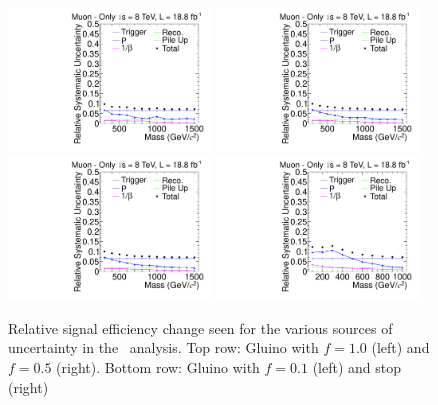 \begin{figure}[ht]
\centering
  \includegraphics[clip=false, trim=0.0cm 0cm 0.0cm 0cm, width=0.48\textwidth]{figures/muonly/MoGluino_f100Uncertainty}
  \includegraphics[clip=false, trim=0.0cm 0cm 0.0cm 0cm, width=0.48\textwidth]{figures/muonly/MoGluino_f50Uncertainty} \\
  \includegraphics[clip=false, trim=0.0cm 0cm 0.0cm 0cm, width=0.48\textwidth]{figures/muonly/MoGluino_f10Uncertainty}
  \includegraphics[clip=false, trim=0.0cm 0cm 0.0cm 0cm, width=0.48\textwidth]{figures/muonly/MoStopUncertainty}
\caption[Relative signal efficiency change seen for the various sources of uncertainty in the \muononly\ analysis]
{Relative signal efficiency change seen for the various sources of uncertainty in the \muononly\ analysis.
Top row: Gluino with $f=1.0$ (left) and $f=0.5$ (right).
Bottom row: Gluino with $f=0.1$ (left) and stop (right)}
    \label{fig:MuOnlyUncSource}
\end{figure}

